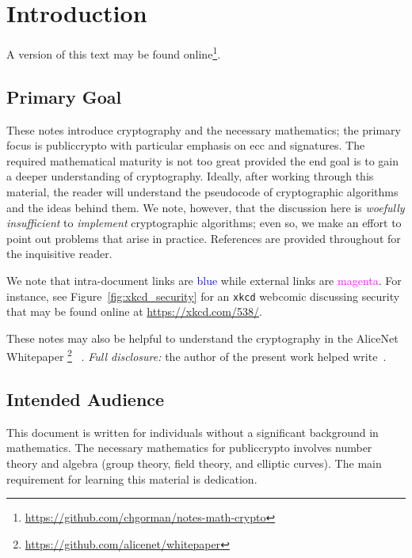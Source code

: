 \chapter{Introduction}
\label{chap:intro}

A version of this text may be found
online\footnote{\url{https://github.com/chgorman/notes-math-crypto}}.



\section{Primary Goal}

These notes introduce cryptography and the necessary mathematics;
the primary focus is \gls{publiccrypto}
with particular emphasis on \gls{ecc} and \glspl{signature}.
The required mathematical maturity is not too great
provided the end goal is to gain a deeper understanding of cryptography.
Ideally, after working through this material, the reader
will understand the pseudocode of cryptographic algorithms
and the ideas behind them.
We note, however, that the discussion here is \emph{woefully insufficient}
to \emph{implement} cryptographic algorithms;
even so, we make an effort to point out
problems that arise in practice.
References are provided throughout for the inquisitive reader.

We note that intra-document links are \textcolor{blue}{blue}
while external links are \textcolor{magenta}{magenta}.
For instance, see Figure~\ref{fig:xkcd_security} for an
\texttt{xkcd} webcomic discussing security
that may be found online at \url{https://xkcd.com/538/}.



These notes may also be helpful to understand the cryptography in the
AliceNet Whitepaper%
\footnote{\url{https://github.com/alicenet/whitepaper}}%
~\cite{AliceNetWhitepaper}.
\emph{Full disclosure:} the author of the present work
helped write~\cite{AliceNetWhitepaper}.



\section{Intended Audience}

This document is written for individuals without a significant
background in mathematics.
The necessary mathematics for \gls{publiccrypto} involves
\gls{number theory} and algebra (\gls{group} theory, \gls{field} theory, and
\glspl{elliptic curve}).
The main requirement for learning this material is dedication.

